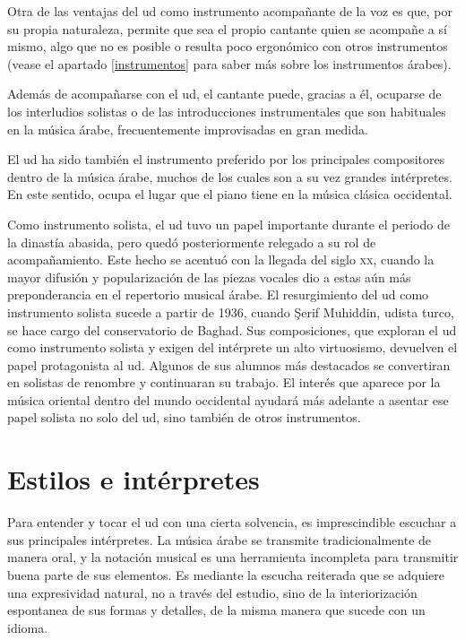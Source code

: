 Otra de las ventajas del ud como instrumento acompañante de la voz es que, por su propia naturaleza, permite que sea el propio cantante quien se acompañe a sí mismo, algo que no es posible o resulta poco ergonómico con otros instrumentos (vease el apartado \ref{instrumentos} para saber más sobre los instrumentos árabes).

Además de acompañarse con el ud, el cantante puede, gracias a él, ocuparse de los interludios solistas o de las introducciones instrumentales que son habituales en la música árabe, frecuentemente improvisadas en gran medida.

El ud ha sido también el instrumento preferido por los principales compositores dentro de la música árabe, muchos de los cuales son a su vez grandes intérpretes. En este sentido, ocupa el lugar que el piano tiene en la música clásica occidental.

Como instrumento solista, el ud tuvo un papel importante durante el periodo de la dinastía abasida, pero quedó posteriormente relegado a su rol de acompañamiento. Este hecho se acentuó con la llegada del siglo \textsc{xx}, cuando la mayor difusión y popularización de las piezas vocales dio a estas aún más preponderancia en el repertorio musical árabe. El resurgimiento del ud como instrumento solista sucede a partir de 1936, cuando Şerif Muhiddin, udista turco, se hace cargo del conservatorio de Baghad. Sus composiciones, que exploran el ud como instrumento solista y exigen del intérprete un alto virtuosismo, devuelven el papel protagonista al ud. Algunos de sus alumnos más destacados se convertiran en solistas de renombre y continuaran su trabajo. El interés que aparece por la música oriental dentro del mundo occidental ayudará más adelante a asentar ese papel solista no solo del ud, sino también de otros instrumentos.

\section{Estilos e intérpretes}
\label{estilos}

Para entender y tocar el ud con una cierta solvencia, es imprescindible escuchar a sus principales intérpretes. La música árabe se transmite tradicionalmente de manera oral, y la notación musical es una herramienta incompleta para transmitir buena parte de sus elementos. Es mediante la escucha reiterada que se adquiere una expresividad natural, no a través del estudio, sino de la interiorización espontanea de sus formas y detalles, de la misma manera que sucede con un idioma.

